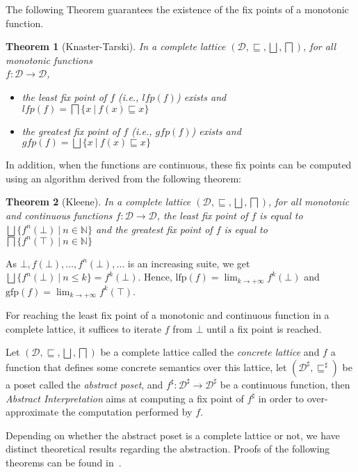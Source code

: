 \documentclass[submission,copyright,creativecommons]{eptcs}
\newtheorem{theorem}{Theorem}
\newcommand{\sh}[1]{\ensuremath{#1^\sharp}}
\newcommand{\lfp}{\ensuremath{\textrm{lfp}}}
\newcommand{\gfp}{\ensuremath{\textrm{gfp}}}
\newcommand{\treillisc}{\ensuremath{
(\mathcal{D}, \sqsubseteq, \bigsqcup, \bigsqcap)}}
\begin{document}
\noindent
The following Theorem guarantees the existence
of the fix points of a monotonic function.
\begin{theorem}[Knaster-Tarski]
  In a complete lattice $\treillisc$, for all monotonic functions\\ 
$f: \mathcal{D} \rightarrow \mathcal{D}$, 
\begin{itemize}
\item the least fix point of $f$ (i.e., $lfp(f)$) exists and $lfp(f) = \bigsqcap\{x~|~f(x) \sqsubseteq x\}$
\item the greatest fix point of $f$ (i.e., $gfp(f)$) exists and $gfp(f) = \bigsqcup\{x~|~f(x) \sqsubseteq x\}$
\end{itemize}
\end{theorem}
\noindent
In addition, when the functions are continuous, these fix points can be computed using an algorithm derived from the
following theorem:
\begin{theorem}[Kleene]\label{theo:limites}
  In a complete lattice $\treillisc$, for all monotonic and continuous functions 
  $f : \mathcal{D} \rightarrow \mathcal{D}$, the least fix point of
  $f$ is equal to $\bigsqcup\{f^n(\bot)~|~n \in \mathbb{N}\}$ and the greatest fix point
  of $f$ is equal to $\bigsqcap\{f^n(\top)~|~n \in \mathbb{N}\}$
\end{theorem}
\noindent
As $\bot, f(\bot), \ldots, f^n(\bot), \ldots$ is an increasing suite, we get
$\bigsqcup\{f^n(\bot)~|~n \leq k\} = f^k(\bot)$.
Hence, $\lfp(f) = \lim_{k \rightarrow +\infty} f^k(\bot)$
and $\gfp(f) = \lim_{k \rightarrow +\infty} f^k(\top)$.

\noindent
For reaching the least fix point of a monotonic and continuous function in a complete lattice, it
suffices to iterate $f$ from $\bot$ until a fix point is reached.

\noindent
Let $(\mathcal{D}, \sqsubseteq,\bigsqcup, \bigsqcap)$ be a complete lattice called the {\it concrete lattice} 
and $f$ a function that defines some concrete semantics over this lattice, let
$(\sh{\mathcal{D}}, \sh{\sqsubseteq})$ be a poset called the {\it abstract poset}, and
$\sh{f} : \sh{\mathcal{D}} \rightarrow \sh{\mathcal{D}}$ be a continuous function,
then {\it Abstract Interpretation} aims at computing a fix point of $\sh{f}$ in order to
over-approximate the computation performed by $f$. 

\noindent
Depending on whether the abstract poset is a complete lattice or not,
we have distinct theoretical results regarding the abstraction. Proofs of
the following theorems can be found in~\cite{CH78}.
\end{document}
